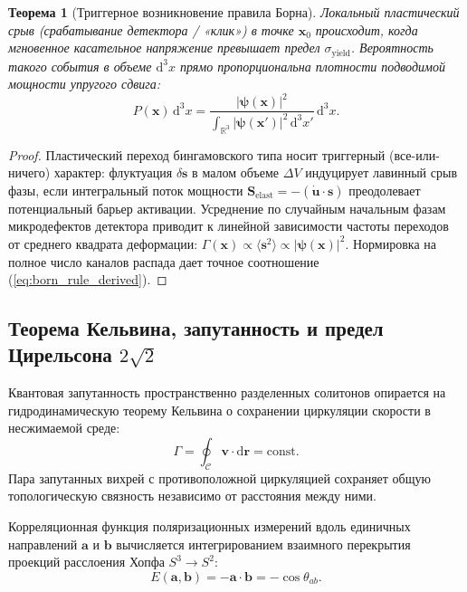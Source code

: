 \documentclass[12pt,a4paper]{article}
\newtheorem{theorem}{Теорема}[section]
\theoremstyle{definition}
\theoremstyle{remark}
\begin{document}
\begin{theorem}[Триггерное возникновение правила Борна]
	Локальный пластический срыв (срабатывание детектора / «клик») в точке $\mathbf{x}_0$ происходит, когда мгновенное касательное напряжение превышает предел $\sigma_{\mathrm{yield}}$. Вероятность такого события в объеме $\mathrm{d}^3x$ прямо пропорциональна плотности подводимой мощности упругого сдвига:
	\begin{equation}
		P(\mathbf{x}) \, \mathrm{d}^3 x = \frac{|\boldsymbol{\psi}(\mathbf{x})|^2}{\int_{\mathbb{R}^3} |\boldsymbol{\psi}(\mathbf{x}')|^2 \, \mathrm{d}^3 x'} \, \mathrm{d}^3 x.
		\label{eq:born_rule_derived}
	\end{equation}
\end{theorem}

\begin{proof}
	Пластический переход бингамовского типа носит триггерный (все-или-ничего) характер: флуктуация $\delta \mathbf{s}$ в малом объеме $\Delta V$ индуцирует лавинный срыв фазы, если интегральный поток мощности $\mathbf{S}_{\mathrm{elast}} = -(\dot{\mathbf{u}} \cdot \mathbf{s})$ преодолевает потенциальный барьер активации. Усреднение по случайным начальным фазам микродефектов детектора приводит к линейной зависимости частоты переходов от среднего квадрата деформации: $\Gamma(\mathbf{x}) \propto \langle \mathbf{s}^2 \rangle \propto |\boldsymbol{\psi}(\mathbf{x})|^2$. Нормировка на полное число каналов распада дает точное соотношение (\ref{eq:born_rule_derived}).
\end{proof}

\subsection{Теорема Кельвина, запутанность и предел Цирельсона $2\sqrt{2}$}
Квантовая запутанность пространственно разделенных солитонов опирается на гидродинамическую теорему Кельвина о сохранении циркуляции скорости в несжимаемой среде:
\begin{equation}
	\Gamma = \oint_{\mathcal{C}} \mathbf{v} \cdot \mathrm{d}\mathbf{r} = \mathrm{const}.
	\label{eq:kelvin_theorem}
\end{equation}
Пара запутанных вихрей с противоположной циркуляцией сохраняет общую топологическую связность независимо от расстояния между ними.

Корреляционная функция поляризационных измерений вдоль единичных направлений $\mathbf{a}$ и $\mathbf{b}$ вычисляется интегрированием взаимного перекрытия проекций расслоения Хопфа $S^3 \to S^2$:
\begin{equation}
	E(\mathbf{a}, \mathbf{b}) = -\mathbf{a} \cdot \mathbf{b} = -\cos\theta_{ab}.
	\label{eq:bell_correlation}
\end{equation}
\end{document}

